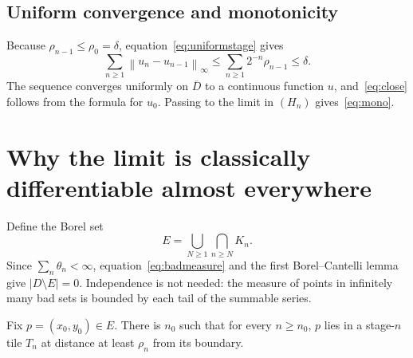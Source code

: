 \documentclass[11pt,letterpaper]{article}
\numberwithin{equation}{section}
\theoremstyle{remark}
\newcommand{\norm}[1]{\left\lVert#1\right\rVert}
\newcommand{\closure}[1]{\overline{#1}}
\begin{document}
\subsection{Uniform convergence and monotonicity}

Because $\rho_{n-1}\le\rho_0=\delta$, equation~\eqref{eq:uniformstage} gives
\[
 \sum_{n\ge1}\norm{u_n-u_{n-1}}_\infty
 \le\sum_{n\ge1}2^{-n}\rho_{n-1}\le\delta.
\]
The sequence converges uniformly on $\closure D$ to a continuous function $u$, and~\eqref{eq:close} follows from the formula for $u_0$. Passing to the limit in $(H_n)$ gives~\eqref{eq:mono}.

\FloatBarrier
\section{Why the limit is classically differentiable almost everywhere}
\label{sec:diff}

Define the Borel set
\begin{equation}\label{eq:E}
 E=\bigcup_{N\ge1}\bigcap_{n\ge N}K_n.
\end{equation}
Since $\sum_n\theta_n<\infty$, equation~\eqref{eq:badmeasure} and the first Borel--Cantelli lemma give $|D\setminus E|=0$. Independence is not needed: the measure of points in infinitely many bad sets is bounded by each tail of the summable series.

Fix $p=(x_0,y_0)\in E$. There is $n_0$ such that for every $n\ge n_0$, $p$ lies in a stage-$n$ tile $T_n$ at distance at least $\rho_n$ from its boundary.
\end{document}

